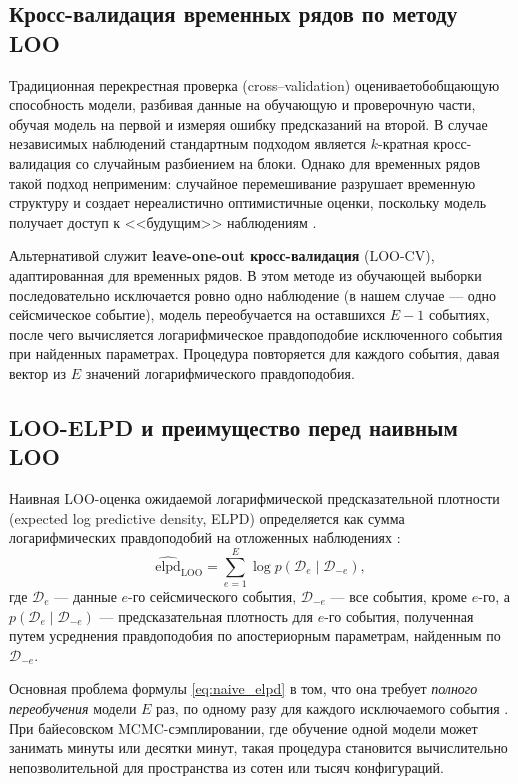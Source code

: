 \documentclass[14pt]{mmcs_article}
\begin{document}
\subsection*{Кросс-валидация временных рядов по методу LOO}

Традиционная перекрестная проверка (cross--validation)
оценивает\linebreak обобщающую способность модели, разбивая данные на
обучающую и проверочную части, обучая модель на первой и
измеряя ошибку предсказаний на второй. В случае независимых
наблюдений стандартным подходом является $k$-кратная
кросс-валидация со случайным разбиением на блоки. Однако для
временных рядов такой подход неприменим: случайное
перемешивание разрушает временную структуру и создает
нереалистично оптимистичные оценки, поскольку модель получает
доступ к <<будущим>> наблюдениям \cite{Bergmeir2012}.

Альтернативой служит \textbf{leave-one-out кросс-валидация}
(LOO-CV), адаптированная для временных рядов. В этом методе из
обучающей выборки последовательно исключается ровно одно
наблюдение (в нашем случае — одно сейсмическое событие),
модель переобучается на оставшихся $E-1$ событиях, после чего
вычисляется логарифмическое правдоподобие исключенного события
при найденных параметрах. Процедура повторяется для каждого
события, давая вектор из $E$ значений логарифмического
правдоподобия.

\subsection*{LOO-ELPD и преимущество перед наивным LOO}

Наивная LOO-оценка ожидаемой логарифмической предсказательной
плотности (expected log predictive density, ELPD) определяется
как сумма логарифмических правдоподобий на отложенных
наблюдениях \cite{Vehtari2017}:
\begin{equation}\label{eq:naive_elpd}
	\widehat{\mathrm{elpd}}_{\mathrm{LOO}} = 
	\sum_{e=1}^{E} \log p(\mathcal{D}_e \mid \mathcal{D}_{-e}),
\end{equation}
где $\mathcal{D}_e$ — данные $e$-го сейсмического события,
$\mathcal{D}_{-e}$ — все события, кроме $e$-го, а
$p(\mathcal{D}_e \mid \mathcal{D}_{-e})$ — предсказательная
плотность для $e$-го события, полученная путем усреднения
правдоподобия по апостериорным параметрам, найденным по
$\mathcal{D}_{-e}$.

Основная проблема формулы \eqref{eq:naive_elpd} в том, что она
требует \textit{полного переобучения} модели $E$ раз, по
одному разу для каждого исключаемого события
\cite{Vehtari2017}. При байесовском MCMC-сэмплировании, где
обучение одной модели может занимать минуты или десятки минут,
такая процедура становится вычислительно непозволительной для
пространства из сотен или тысяч конфигураций.
\end{document}
